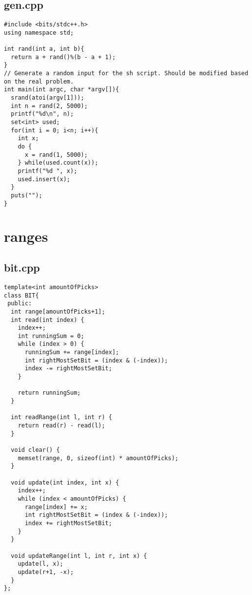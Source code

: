 \documentclass[11pt,landscape,twocolumn]{article}
\begin{document}
\subsection*{gen.cpp}
\begin{lstlisting}
#include <bits/stdc++.h>
using namespace std;

int rand(int a, int b){
  return a + rand()%(b - a + 1);
}
// Generate a random input for the sh script. Should be modified based on the real problem.
int main(int argc, char *argv[]){
  srand(atoi(argv[1]));
  int n = rand(2, 5000);
  printf("%d\n", n);
  set<int> used;
  for(int i = 0; i<n; i++){
    int x;
    do {
      x = rand(1, 5000);
    } while(used.count(x));
    printf("%d ", x);
    used.insert(x);
  }
  puts("");
}
\end{lstlisting}

\section{ranges}
\subsection*{bit.cpp}
\begin{lstlisting}
template<int amountOfPicks>
class BIT{
 public:
  int range[amountOfPicks+1];
  int read(int index) {
    index++;
    int runningSum = 0;
    while (index > 0) {
      runningSum += range[index];
      int rightMostSetBit = (index & (-index));
      index -= rightMostSetBit;
    }
 
    return runningSum;
  }

  int readRange(int l, int r) {
    return read(r) - read(l);
  }

  void clear() {
    memset(range, 0, sizeof(int) * amountOfPicks);
  }
 
  void update(int index, int x) {
    index++;
    while (index < amountOfPicks) {
      range[index] += x;
      int rightMostSetBit = (index & (-index));
      index += rightMostSetBit;
    }
  }
 
  void updateRange(int l, int r, int x) {
    update(l, x);
    update(r+1, -x);
  }
};

\end{lstlisting}
\end{document}
